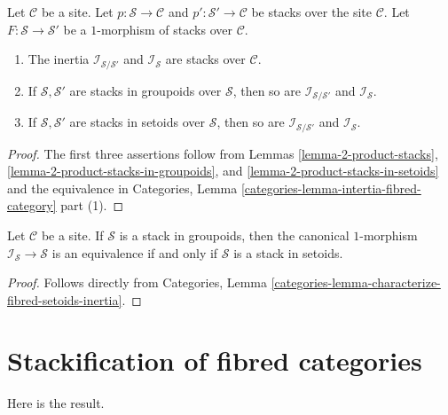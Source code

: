 \begin{lemma}
\label{lemma-inertia}
Let $\mathcal{C}$ be a site. Let
$p : \mathcal{S} \to \mathcal{C}$ and
$p' : \mathcal{S}' \to \mathcal{C}$
be stacks over the site $\mathcal{C}$.
Let $F : \mathcal{S} \to \mathcal{S}'$ be a $1$-morphism of
stacks over $\mathcal{C}$.
\begin{enumerate}
\item The inertia $\mathcal{I}_{\mathcal{S}/\mathcal{S}'}$ and
$\mathcal{I}_{\mathcal{S}}$ are stacks over $\mathcal{C}$.
\item If $\mathcal{S}, \mathcal{S}'$ are stacks in groupoids over
$\mathcal{S}$, then so are $\mathcal{I}_{\mathcal{S}/\mathcal{S}'}$ and
$\mathcal{I}_{\mathcal{S}}$.
\item If $\mathcal{S}, \mathcal{S}'$ are stacks in setoids over $\mathcal{S}$,
then so are $\mathcal{I}_{\mathcal{S}/\mathcal{S}'}$ and
$\mathcal{I}_{\mathcal{S}}$.
\end{enumerate}
\end{lemma}

\begin{proof}
The first three assertions follow from
Lemmas \ref{lemma-2-product-stacks},
\ref{lemma-2-product-stacks-in-groupoids}, and
\ref{lemma-2-product-stacks-in-setoids}
and the equivalence in
Categories, Lemma \ref{categories-lemma-intertia-fibred-category} part (1).
\end{proof}

\begin{lemma}
\label{lemma-characterize-stack-in-setoids}
Let $\mathcal{C}$ be a site. 
If $\mathcal{S}$ is a stack in groupoids, then the
canonical $1$-morphism $\mathcal{I}_\mathcal{S} \to \mathcal{S}$
is an equivalence if and only if $\mathcal{S}$ is a stack in setoids.
\end{lemma}

\begin{proof}
Follows directly from
Categories, Lemma \ref{categories-lemma-characterize-fibred-setoids-inertia}.
\end{proof}




\section{Stackification of fibred categories}
\label{section-stackify}

\noindent
Here is the result.


